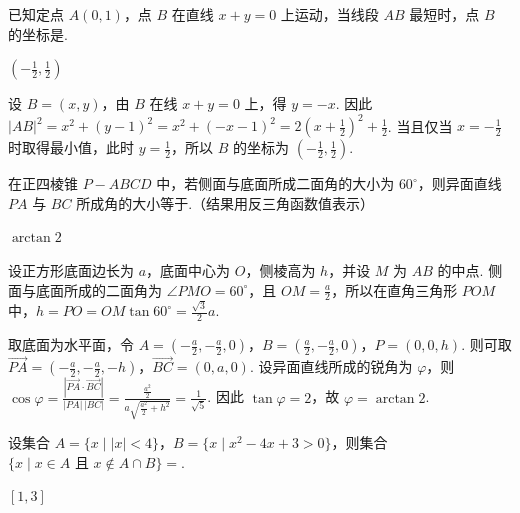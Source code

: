 \begin{problem}
已知定点 \(A(0,1)\)，点 \(B\) 在直线 \(x + y = 0\) 上运动，当线段 \(AB\) 最短时，点 \(B\) 的坐标是\fillinblank{}.
\end{problem}

\begin{answer}
\(\left(-\frac{1}{2},\frac{1}{2}\right)\)
\end{answer}

\begin{solution}
设 \(B=(x,y)\)，由 \(B\) 在线 \(x+y=0\) 上，得 \(y=-x\). 因此 \(|AB|^2=x^2+(y-1)^2=x^2+(-x-1)^2=2\left(x+\frac{1}{2}\right)^2+\frac{1}{2}\). 当且仅当 \(x=-\frac{1}{2}\) 时取得最小值，此时 \(y=\frac{1}{2}\)，所以 \(B\) 的坐标为 \(\left(-\frac{1}{2},\frac{1}{2}\right)\).
\end{solution}

\begin{problem}
在正四棱锥 \(P - ABCD\) 中，若侧面与底面所成二面角的大小为 \(60^{\circ}\)，则异面直线 \(PA\) 与 \(BC\) 所成角的大小等于\fillinblank{}.（结果用反三角函数值表示）
\end{problem}

\begin{answer}
\(\arctan 2\)
\end{answer}

\begin{solution}
设正方形底面边长为 \(a\)，底面中心为 \(O\)，侧棱高为 \(h\)，并设 \(M\) 为 \(AB\) 的中点. 侧面与底面所成的二面角为 \(\angle PMO=60^{\circ}\)，且 \(OM=\frac{a}{2}\)，所以在直角三角形 \(POM\) 中，\(h=PO=OM\tan60^{\circ}=\frac{\sqrt{3}}{2}a\).

取底面为水平面，令 \(A=\left(-\frac{a}{2},-\frac{a}{2},0\right)\)，\(B=\left(\frac{a}{2},-\frac{a}{2},0\right)\)，\(P=(0,0,h)\). 则可取 \(\overrightarrow{PA}=\left(-\frac{a}{2},-\frac{a}{2},-h\right)\)，\(\overrightarrow{BC}=(0,a,0)\). 设异面直线所成的锐角为 \(\varphi\)，则 \(\cos\varphi=\frac{\left|\overrightarrow{PA}\cdot\overrightarrow{BC}\right|}{|PA|\,|BC|}=\frac{\frac{a^2}{2}}{a\sqrt{\frac{a^2}{2}+h^2}}=\frac{1}{\sqrt{5}}\). 因此 \(\tan\varphi=2\)，故 \(\varphi=\arctan 2\).
\end{solution}

\begin{problem}
设集合 \(A = \{x \mid |x| < 4\}\)，\(B = \{x \mid x^2 - 4x + 3 > 0\}\)，则集合 \(\{x \mid x \in A \text{ 且 } x \notin A \cap B\} =\)\fillinblank{}.
\end{problem}

\begin{answer}
\(\left[1,3\right]\)
\end{answer}

